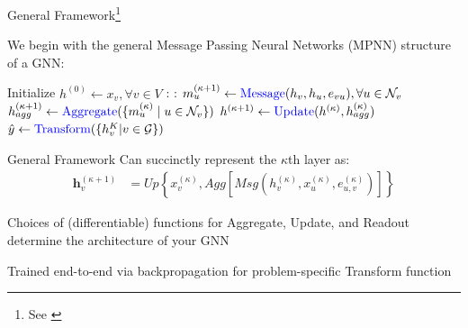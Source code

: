 \documentclass{beamer}
\newcommand{\nhood}{\mathcal{N}}
\newcommand{\Graph}{\mathcal{G}}
\newcommand{\NodeSet}{V}
\newcommand{\node}{v}
\newcommand{\nrepresent}{h}
\newcommand{\edge}{e}
\newcommand{\iter}{\kappa}
\newcommand{\Iter}{K}
\begin{document}
\begin{frame}{
    General Framework\footnote{See \cite{ektefaie_multimodal_2023,gilmer_neural_2017, xu_how_2019}}
    }

    We begin with the general Message Passing Neural Networks (MPNN) structure of a GNN: 

    \vspace{4mm}
    
    \begin{algorithmic}[1]
    \State Initialize $\nrepresent^{(0)} \gets x_\node, \forall \node \in \NodeSet$ 
        \For{$\iter = 0, ..., \Iter$}:
            \For{$\node \in \Graph$}:
            \State $m_u^{(\iter+1)} \gets \text{\textcolor{blue}{Message}}(h_\node, h_u, \edge_{\node u}), \forall u \in \nhood_\node$
            \State $\nrepresent_{agg}^{(\iter+1)} \gets \text{\textcolor{blue}{Aggregate}}(\{m_u^{(\iter)} \mid u \in \nhood_\node\})$ 
            \State $\nrepresent^{(\iter+1)} \gets \text{\textcolor{blue}{Update}}(\nrepresent^{(\iter)}, \nrepresent_{agg}^{(\iter)})$
            \EndFor
        \EndFor
        \State $\hat{y} \gets \text{\textcolor{blue}{Transform}}(\{h^\Iter_\node | \node \in \Graph\})$ 
    \end{algorithmic}   

\end{frame}




\begin{frame}{General Framework}
Can succinctly represent the $\iter$th layer as: 
\begin{align*}
\iffalse 
    \mathbf{h}_\node^{(\iter+1)} 
    &=
    \text{Update}
    \left\{ 
    x_\node^{(\iter)}
    ,   
    \text{Aggregate}
    \left[
        \text{Message}
        \left(
        h_\node^{(\iter)}, x_u^{(\iter)}, \edge_{u,\node}^{(\iter)}
        \right)
    \right]
    \right\}
\\
\fi
    \mathbf{h}_\node^{(\iter+1)} 
    &=
    Up
    \left\{ 
    x_\node^{(\iter)}
    ,   
    Agg
    \left[
        Msg
        \left(
        h_\node^{(\iter)}, x_u^{(\iter)}, \edge_{u,\node}^{(\iter)}
        \right)
    \right]
    \right\}
\end{align*}

Choices of (differentiable) functions for Aggregate, Update, and Readout determine the architecture of your GNN 

\vspace{4mm}

Trained end-to-end via backpropagation for problem-specific Transform function 

\end{frame}
\end{document}
